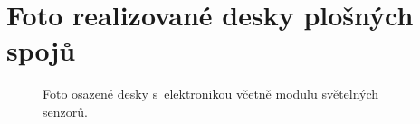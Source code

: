 \chapter{Foto realizované desky plošných spojů}
\begin{figure}[h]
	\centering
	\quad
	\caption{Foto osazené desky s~elektronikou včetně modulu světelných senzorů.}
	\label{fig_finalPCB}
\end{figure}

